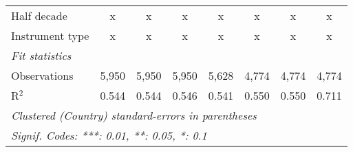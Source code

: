 \begin{tabular}{lccccccc}
   Half decade                                                                               & x       & x       & x             & x             & x             & x             & x\\  
   Instrument type                                                                           & x       & x       & x             & x             & x             & x             & x\\  
   \midrule \emph{Fit statistics}\\
   Observations                                                                              & 5,950   & 5,950   & 5,950         & 5,628         & 4,774         & 4,774         & 4,774\\  
   R$^2$                                                                                     & 0.544   & 0.544   & 0.546         & 0.541         & 0.550         & 0.550         & 0.711\\  
   \midrule
   \multicolumn{8}{l}{\emph{Clustered (Country) standard-errors in parentheses}}\\
   \multicolumn{8}{l}{\emph{Signif. Codes: ***: 0.01, **: 0.05, *: 0.1}}\\
\end{tabular}
\par\endgroup


